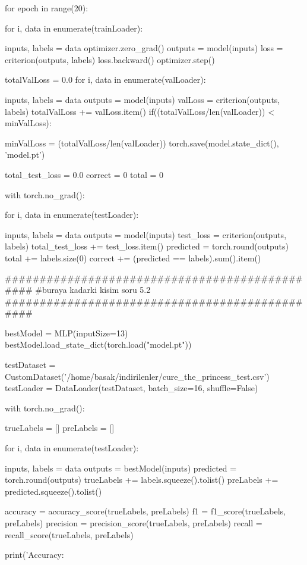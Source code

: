 \documentclass[11pt]{article}
\begin{document}
\begin{python}
for epoch in range(20):

    for i, data in enumerate(trainLoader):

        inputs, labels = data
        optimizer.zero_grad()
        outputs = model(inputs)
        loss = criterion(outputs, labels)
        loss.backward()
        optimizer.step()

    totalValLoss = 0.0
    for i, data in enumerate(valLoader):

        inputs, labels = data
        outputs = model(inputs)
        valLoss = criterion(outputs, labels)
        totalValLoss += valLoss.item()
    if((totalValLoss/len(valLoader)) < minValLoss):

        minValLoss = (totalValLoss/len(valLoader))
        torch.save(model.state_dict(), 'model.pt')

total_test_loss = 0.0
correct = 0
total = 0

with torch.no_grad():

    for i, data in enumerate(testLoader):

        inputs, labels = data
        outputs = model(inputs)
        test_loss = criterion(outputs, labels)
        total_test_loss += test_loss.item()
        predicted = torch.round(outputs)
        total += labels.size(0)
        correct += (predicted == labels).sum().item()

###############################################
#buraya kadarki kisim soru 5.2
###############################################

bestModel = MLP(inputSize=13)
bestModel.load_state_dict(torch.load("model.pt"))

testDataset = CustomDataset('/home/basak/indirilenler/cure_the_princess_test.csv')
testLoader = DataLoader(testDataset, batch_size=16, shuffle=False)

with torch.no_grad():

    trueLabels = []
    preLabels = []

    for i, data in enumerate(testLoader):

        inputs, labels = data
        outputs = bestModel(inputs)
        predicted = torch.round(outputs)
        trueLabels += labels.squeeze().tolist()
        preLabels += predicted.squeeze().tolist()

accuracy = accuracy_score(trueLabels, preLabels)
f1 = f1_score(trueLabels, preLabels)
precision = precision_score(trueLabels, preLabels)
recall = recall_score(trueLabels, preLabels)

print('Accuracy: %
\end{python}
\end{document}
